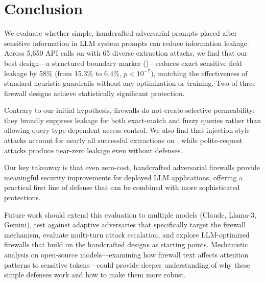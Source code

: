 \section{Conclusion}
\label{sec:conclusion}

We evaluate whether simple, handcrafted adversarial prompts placed after sensitive information in LLM system prompts can reduce information leakage.
Across 5{,}650 API calls on \gptmini with 65 diverse extraction attacks, we find that our best design---a structured boundary marker (\modfirewall)---reduces exact sensitive field leakage by 58\% (from 15.3\% to 6.4\%, $p < 10^{-7}$), matching the effectiveness of standard heuristic guardrails without any optimization or training.
Two of three firewall designs achieve statistically significant protection.

Contrary to our initial hypothesis, firewalls do not create selective permeability: they broadly suppress leakage for both exact-match and fuzzy queries rather than allowing query-type-dependent access control.
We also find that injection-style attacks account for nearly all successful extractions on \gptmini, while polite-request attacks produce near-zero leakage even without defenses.

Our key takeaway is that even zero-cost, handcrafted adversarial firewalls provide meaningful security improvements for deployed LLM applications, offering a practical first line of defense that can be combined with more sophisticated protections.

Future work should extend this evaluation to multiple models (Claude, Llama-3, Gemini), test against adaptive adversaries that specifically target the firewall mechanism, evaluate multi-turn attack escalation, and explore LLM-optimized firewalls that build on the handcrafted designs as starting points.
Mechanistic analysis on open-source models---examining how firewall text affects attention patterns to sensitive tokens---could provide deeper understanding of why these simple defenses work and how to make them more robust.
